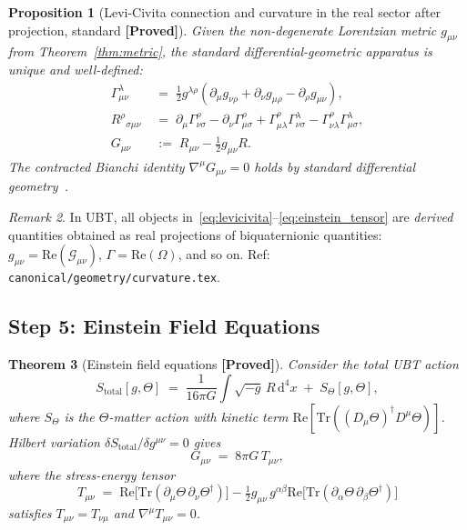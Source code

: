 \documentclass[12pt,a4paper]{article}
\newtheorem{theorem}{Theorem}[section]
\newtheorem{proposition}[theorem]{Proposition}
\theoremstyle{definition}
\theoremstyle{remark}
\newtheorem{remark}[theorem]{Remark}
\newcommand{\PROVED}{\textbf{[Proved]}}
\newcommand{\Gmn}{G_{\mu\nu}}
\newcommand{\gmn}{g_{\mu\nu}}
\newcommand{\Tmn}{T_{\mu\nu}}
\newcommand{\Stot}{S_{\mathrm{total}}}
\newcommand{\Tr}{\mathrm{Tr}}
\newcommand{\Re}{\mathrm{Re}}
\begin{document}
\begin{proposition}[Levi-Civita connection and curvature in the real sector after projection, standard \PROVED]
\label{prop:geom}
Given the non-degenerate Lorentzian metric $\gmn$ from Theorem~\ref{thm:metric},
the standard differential-geometric apparatus is unique and well-defined:
\begin{align}
  \Gamma^\lambda_{\mu\nu} &\;=\;
    \tfrac{1}{2}g^{\lambda\rho}
    (\partial_\mu g_{\nu\rho} + \partial_\nu g_{\mu\rho} - \partial_\rho g_{\mu\nu}),
    \label{eq:levicivita} \\
  R^\rho{}_{\sigma\mu\nu} &\;=\;
    \partial_\mu\Gamma^\rho_{\nu\sigma} - \partial_\nu\Gamma^\rho_{\mu\sigma}
    + \Gamma^\rho_{\mu\lambda}\Gamma^\lambda_{\nu\sigma}
    - \Gamma^\rho_{\nu\lambda}\Gamma^\lambda_{\mu\sigma},
    \label{eq:riemann} \\
  \Gmn &\;:=\; R_{\mu\nu} - \tfrac{1}{2}g_{\mu\nu}R.
    \label{eq:einstein_tensor}
\end{align}
The contracted Bianchi identity $\nabla^\mu\Gmn = 0$ holds by standard differential
geometry~\cite{Wald1984,MTW1973}.
\end{proposition}

\begin{remark}
In UBT, all objects in~\eqref{eq:levicivita}--\eqref{eq:einstein_tensor} are
\emph{derived} quantities obtained as real projections of biquaternionic quantities:
$\gmn = \Re(\mathcal{G}_{\mu\nu})$,
$\Gamma = \Re(\Omega)$, and so on.
Ref: \texttt{canonical/geometry/curvature.tex}.
\end{remark}

\subsection{Step 5: Einstein Field Equations}
\label{sec:step5}

\begin{theorem}[Einstein field equations \PROVED]
\label{thm:einstein}
Consider the total UBT action
\[
  \Stot[g,\Theta]
  \;=\; \frac{1}{16\pi G}\int\!\sqrt{-g}\,R\,\mathrm{d}^4x
  \;+\; S_\Theta[g,\Theta],
\]
where $S_\Theta$ is the $\Theta$-matter action with kinetic term
$\Re[\Tr((D_\mu\Theta)^\dagger D^\mu\Theta)]$.  Hilbert variation
$\delta\Stot/\delta g^{\mu\nu} = 0$ gives
\[
  \Gmn \;=\; 8\pi G\,\Tmn,
\]
where the stress-energy tensor
\[
  \Tmn \;=\;
    \Re\bigl[\Tr(\partial_\mu\Theta\,\partial_\nu\Theta^\dagger)\bigr]
    - \tfrac{1}{2}g_{\mu\nu}\,g^{\alpha\beta}
      \Re\bigl[\Tr(\partial_\alpha\Theta\,\partial_\beta\Theta^\dagger)\bigr]
\]
satisfies $\Tmn = T_{\nu\mu}$ and $\nabla^\mu\Tmn = 0$.
\end{theorem}
\end{document}
